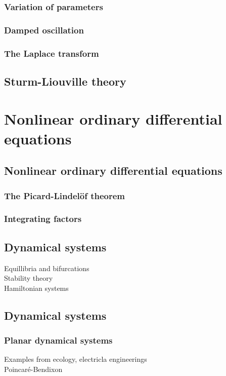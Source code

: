 \documentclass{../note}
\begin{document}
\section{Variation of parameters}
\section{Damped oscillation}
\section{The Laplace transform}

\chapter{Sturm-Liouville theory}







\part{Nonlinear ordinary differential equations}

\chapter{Nonlinear ordinary differential equations}
\section{The Picard-Lindel\"of theorem}
\section{Integrating factors}

\chapter{Dynamical systems}
Equillibria and bifurcations\\
Stability theory\\
Hamiltonian systems

\chapter{Dynamical systems}
\section{Planar dynamical systems}
Examples from ecology, electricla engineerings\\
Poincar\'e-Bendixon
\end{document}
